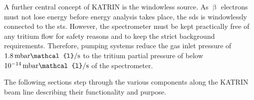 A further central concept of KATRIN is the windowless source. As $\upbeta$ electrons must not lose energy before energy analysis takes place, the \gls{sds} is windowlessly connected to the \gls{sts}. However, the spectrometer must be kept practically free of any tritium flow for safety reasons and to keep the strict background requirements. Therefore, pumping systems reduce the gas inlet pressure of $1.8\text{\,mbar}\mathcal{l}/\text{s}$ to the tritium partial pressure of below $10^{-14}\text{\,mbar}\mathcal{l}/\text{s}$ of the spectrometer.

The following sections step through the various components along the KATRIN beam line describing their functionality and purpose.
